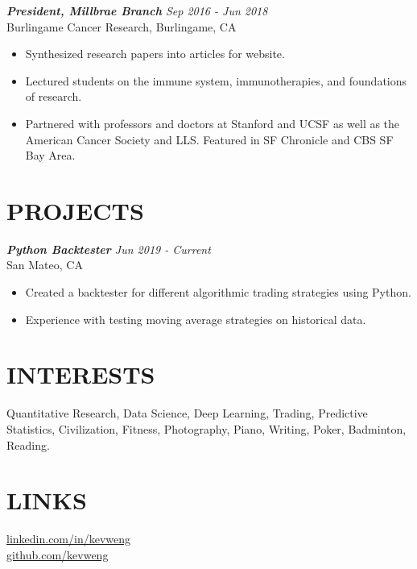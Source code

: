 \documentclass[margin, 10pt]{res} %
\begin{document}
\begin{resume}
{\sl {\bf President, Millbrae Branch} \hfill Sep 2016 - Jun 2018} \\
Burlingame Cancer Research, Burlingame, CA
\begin{itemize}  \itemsep -1pt
\item Synthesized research papers into articles for website. 
\item Lectured students on the immune system, immunotherapies, and foundations of research.
\item Partnered with professors and doctors at Stanford and UCSF as well as the American Cancer Society and LLS. Featured in SF Chronicle and CBS SF Bay Area.
\end{itemize} 




\section{\large PROJECTS} 

{\sl {\bf Python Backtester} \hfill Jun 2019 - Current} \\
San Mateo, CA
\begin{itemize}  \itemsep -1pt
\item Created a backtester for different algorithmic trading strategies using Python.
\item Experience with testing moving average strategies on historical data.
\end{itemize} 
\section{\large INTERESTS}
Quantitative Research, Data Science, Deep Learning, Trading, Predictive Statistics, Civilization, Fitness, Photography, Piano, Writing, Poker, Badminton, Reading.

\section{\large LINKS}

\href{https://www.linkedin.com/in/kevinweng2000/}{linkedin.com/in/kevweng}\\
\href{https://github.com/kevweng}{github.com/kevweng}

\end{resume}
\end{document}
